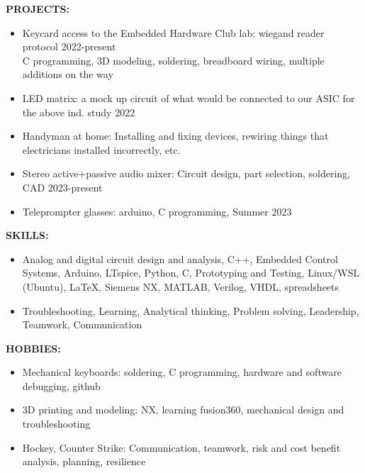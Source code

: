 \documentclass[11pt]{article}
\begin{document}
\textbf{PROJECTS:}
\begin{itemize}
\setlength\itemsep{-.37em}
    \item Keycard access to the Embedded Hardware Club lab: wiegand reader protocol \hfill 2022-present \\
    C programming, 3D modeling, soldering, breadboard wiring, multiple additions on the way
    \item LED matrix: a mock up circuit of what would be connected to our ASIC for the above ind. study \hfill 2022
    \item Handyman at home: Installing and fixing devices, rewiring things that electricians installed incorrectly, etc.
    \item Stereo active+passive audio mixer: Circuit design, part selection, soldering, CAD \hfill 2023-present
    \item Teleprompter glasses: arduino, C programming, \hfill Summer 2023
\end{itemize}

\textbf{SKILLS:}
\begin{itemize}
\setlength\itemsep{-.37em}
    \item Analog and digital circuit design and analysis, C++, Embedded Control Systems, Arduino, LTspice, Python, C, Prototyping and Testing, Linux/WSL (Ubuntu), LaTeX, Siemens NX, MATLAB, Verilog, VHDL, spreadsheets 
    \item Troubleshooting, Learning, Analytical thinking, Problem solving, Leadership, Teamwork, Communication
\end{itemize}

\textbf{HOBBIES:}
\begin{itemize}
\setlength\itemsep{-.37em}
    \item Mechanical keyboards: soldering, C programming, hardware and software debugging, github
    \item 3D printing and modeling: NX, learning fusion360, mechanical design and troubleshooting
    \item Hockey, Counter Strike: Communication, teamwork, risk and cost benefit analysis, planning, resilience
\end{itemize}
\end{document}
